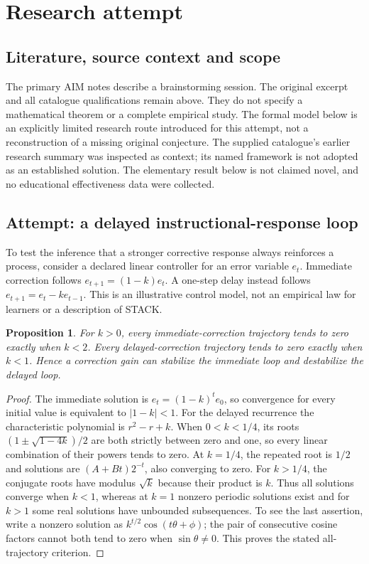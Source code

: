 \documentclass[11pt]{article}
\newtheorem{proposition}{Proposition}
\begin{document}
\section{Research attempt}
\subsection{Literature, source context and scope}
The primary AIM notes describe a brainstorming session. The original excerpt and all catalogue qualifications remain above. They do not specify a mathematical theorem or a complete empirical study. The formal model below is an explicitly limited research route introduced for this attempt, not a reconstruction of a missing original conjecture. The supplied catalogue's earlier research summary was inspected as context; its named framework is not adopted as an established solution. The elementary result below is not claimed novel, and no educational effectiveness data were collected.

\subsection{Attempt: a delayed instructional-response loop}
To test the inference that a stronger corrective response always reinforces a process, consider a declared linear controller for an error variable $e_t$. Immediate correction follows $e_{t+1}=(1-k)e_t$. A one-step delay instead follows $e_{t+1}=e_t-ke_{t-1}$. This is an illustrative control model, not an empirical law for learners or a description of STACK.
\begin{proposition}
For $k>0$, every immediate-correction trajectory tends to zero exactly when $k<2$. Every delayed-correction trajectory tends to zero exactly when $k<1$. Hence a correction gain can stabilize the immediate loop and destabilize the delayed loop.
\end{proposition}
\begin{proof}
The immediate solution is $e_t=(1-k)^te_0$, so convergence for every initial value is equivalent to $|1-k|<1$. For the delayed recurrence the characteristic polynomial is $r^2-r+k$. When $0<k<1/4$, its roots $(1\pm\sqrt{1-4k})/2$ are both strictly between zero and one, so every linear combination of their powers tends to zero. At $k=1/4$, the repeated root is $1/2$ and solutions are $(A+Bt)2^{-t}$, also converging to zero. For $k>1/4$, the conjugate roots have modulus $\sqrt{k}$ because their product is $k$. Thus all solutions converge when $k<1$, whereas at $k=1$ nonzero periodic solutions exist and for $k>1$ some real solutions have unbounded subsequences. To see the last assertion, write a nonzero solution as $k^{t/2}\cos(t\theta+\phi)$; the pair of consecutive cosine factors cannot both tend to zero when $\sin\theta\ne0$. This proves the stated all-trajectory criterion.
\end{proof}
\end{document}
